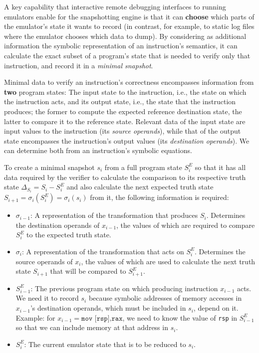 A key capability that interactive remote debugging interfaces to running emulators enable for the snapshotting engine is
that it can \textbf{choose} which parts of the emulator's state it wants to record (in contrast, for example, to static
log files where the emulator chooses which data to dump). By considering as additional information the symbolic
representation of an instruction's semantics, it can calculate the exact subset of a program's state that is needed to
verify only that instruction, and record it in a \textit{minimal snapshot}.

Minimal data to verify an instruction's correctness encompasses information from \textbf{two} program states: The input
state to the instruction, i.e., the state on which the instruction acts, and its output state, i.e., the state that the
instruction produces; the former to compute the expected reference destination state, the latter to compare it to the
reference state. Relevant data of the input state are input values to the instruction (its \textit{source operands}),
while that of the output state encompasses the instruction's output values (its \textit{destination operands}). We can
determine both from an instruction's symbolic equations.

To create a minimal snapshot $s_i$ from a full program state $S^E_i$ so that it has all data required by the verifier to
calculate the comparison to its respective truth state $\Delta_{S_i} = S_i - S^E_i$ and also calculate the next expected
truth state $S_{i+1} = \sigma_i(S^E_i) = \sigma_i(s_i)$ from it, the following information is required:

\begin{itemize}
    \item $\sigma_{i-1}$: A representation of the transformation that produces $S_i$. Determines the destination
        operands of $x_{i-1}$, the values of which are required to compare $S^E_i$ to the expected truth state.
    \item $\sigma_i$: A representation of the transformation that acts on $S^E_i$. Determines the source operands of
        $x_i$, the values of which are used to calculate the next truth state $S_{i+1}$ that will be compared to
        $S^E_{i+1}$.
    \item $S^E_{i-1}$: The previous program state on which producing instruction $x_{i-1}$ acts. We need it to record
        $s_i$ because symbolic addresses of memory accesses in $x_{i-1}$'s destination operands, which must be included
        in $s_i$, depend on it. Example: for $x_{i-1} = \texttt{mov [rsp],rax}$, we need to know the value of
        \texttt{rsp} in $S^E_{i-1}$ so that we can include memory at that address in $s_i$.
    \item $S^E_i$: The current emulator state that is to be reduced to $s_i$.
\end{itemize}

